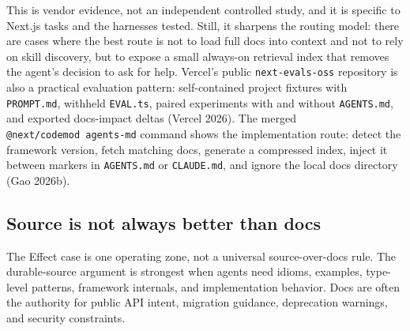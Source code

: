 \documentclass[
  11pt,
  letterpaper,
  numbers=noendperiod,
  parskip=half]{scrartcl}
\begin{document}
\figureVercelEval

This is vendor evidence, not an independent controlled study, and it is
specific to Next.js tasks and the harnesses tested. Still, it sharpens
the routing model: there are cases where the best route is not to load
full docs into context and not to rely on skill discovery, but to expose
a small always-on retrieval index that removes the agent's decision to
ask for help. Vercel's public \texttt{next-evals-oss} repository is also
a practical evaluation pattern: self-contained project fixtures with
\texttt{PROMPT.md}, withheld \texttt{EVAL.ts}, paired experiments with
and without \texttt{AGENTS.md}, and exported docs-impact deltas (Vercel
2026). The merged \texttt{@next/codemod\ agents-md} command shows the
implementation route: detect the framework version, fetch matching docs,
generate a compressed index, inject it between markers in
\texttt{AGENTS.md} or \texttt{CLAUDE.md}, and ignore the local docs
directory (Gao 2026b).

\subsection{Source is not always better than
docs}\label{sec-source-docs}

The Effect case is one operating zone, not a universal source-over-docs
rule. The durable-source argument is strongest when agents need
idioms, examples, type-level patterns, framework internals, and
implementation behavior. Docs are often the authority for public API
intent, migration guidance, deprecation warnings, and security
constraints.
\end{document}
